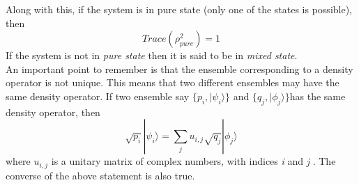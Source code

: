 Along with this, if the system is in pure state (only one of the states is possible), then 
\begin{equation}
Trace(\rho_{pure}^2) = 1
\end{equation}
If the system is not in \textit{pure state} then it is said to be in \textit{mixed state}.\\
An important point to remember is that the ensemble corresponding to a density operator is not unique. This means that two different ensembles may have the same density operator. If two ensemble say $\{p_i,|\psi_i\rangle \}$ and $\{q_j,|\phi_j\rangle \}$has the same density operator, then
\begin{equation}
\sqrt{p_i} | \psi_i \rangle = \sum_j u_{i,j} \sqrt{q_j}|\phi_j \rangle
\end{equation}
where $u_{i,j}$ is a unitary matrix of complex numbers, with indices \textit{i} and \textit{ j } . The converse of the above statement is also true.
\newpage
